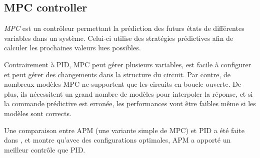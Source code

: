 \subsection{MPC controller}
\emph{MPC} est un contrôleur permettant la prédiction des futurs états de différentes variables dans un système. Celui-ci utilise des stratégies prédictives afin de calculer les prochaines valeurs lues possibles.

Contrairement à PID, MPC peut gérer plusieurs variables, est facile à configurer et peut gérer des changements dans la structure du circuit. Par contre, de nombreux modèles MPC ne supportent que les circuits en boucle ouverte. De plus, ils nécessitent un grand nombre de modèles pour interpoler la réponse, et si la commande prédictive est erronée, les performances vont être faibles même si les modèles sont corrects.

Une comparaison entre APM (une variante simple de MPC) et PID a été faite dans \cite{saletovic2014apm}, et montre qu'avec des configurations optimales, APM a apporté un meilleur contrôle que PID.